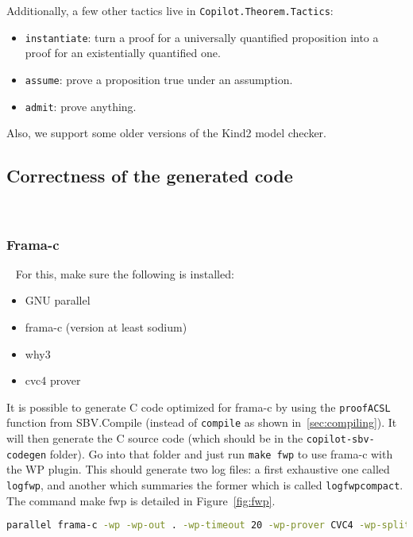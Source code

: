Additionally, a few other tactics live in {\tt Copilot.Theorem.Tactics}:
\begin{itemize}
\item {\tt instantiate}: turn a proof for a universally quantified proposition
into a proof for an existentially quantified one.
\item {\tt assume}: prove a proposition true under an assumption.
\item {\tt admit}: prove anything.
\end{itemize}

Also, we support some older versions of the Kind2 model checker.

\subsection{Correctness of the generated code}~\label{sec:correctness}

\subsubsection{Frama-c}~\label{subsec:frama-c}
For this, make sure the following is installed:

\begin{itemize}
	\item GNU parallel
	\item frama-c (version at least sodium)
	\item why3
	\item cvc4 prover
\end{itemize}

It is possible to generate C code optimized for frama-c by using the \texttt{proofACSL}
function from SBV.Compile (instead of \texttt{compile} as shown
in~\ref{sec:compiling}). It will then generate the C source code (which should be in
the \texttt{copilot-sbv-codegen} folder). Go into that folder and just run
\texttt{make fwp} to use frama-c with the WP plugin. This should generate two
log files: a first exhaustive one called \texttt{logfwp}, and another which
summaries the former which is called \texttt{logfwpcompact}. The command make
fwp is detailed in Figure~\ref{fig:fwp}.

\begin{figure*}[!htb]
	\begin{lstlisting}[frame=none, language=bash]
parallel frama-c -wp -wp-out . -wp-timeout 20 -wp-prover CVC4 -wp-split {} ::: *.c | tee >logfwp >(grep 'Proved\|Unknown\|Timeout\|Failed\|Qed:\s\|CVC4:\s\|Parsing .*\.c' > logfwpcompact) >(grep 'Proved\|Qed:\s\|CVC4:\s\|Unknown\|Timeout\|Failed\|Parsing .*\.c')

	\end{lstlisting}
	\caption{The bash command.}
	\label{fig:fwp}
\end{figure*}

